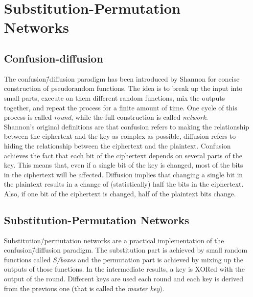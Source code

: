 \section{Substitution-Permutation Networks}
\subsection{Confusion-diffusion}
The confusion\=/diffusion paradigm has been introduced by Shannon for concise construction of pseudorandom functions. The idea is to break up the input into small parts, execute on them different random functions, mix the outputs together, and repeat the process for a finite amount of time. One cycle of this process is called \emph{round}, while the full construction is called \emph{network}.\\
Shannon's original definitions are that confusion refers to making the relationship between the ciphertext and the key as complex as possible, diffusion refers to hiding the relationship between the ciphertext and the plaintext.
Confusion achieves the fact that each bit of the ciphertext depends on several parts of the key. This means that, even if a single bit of the key is changed, most of the bits in the ciphertext will be affected.
Diffusion implies that changing a single bit in the plaintext results in a change of (statistically) half the bits in the ciphertext. Also, if one bit of the ciphertext is changed, half of the plaintext bits change.

\subsection{Substitution-Permutation Networks}
Substitution\=/permutation networks are a practical implementation of the confusion\=/diffusion paradigm. The substitution part is achieved by small random functions called \emph{S\=/boxes} and the permutation part is achieved by mixing up the outputs of those functions. In the intermediate results, a key is XORed with the output of the round. Different keys are used each round and each key is derived from the previous one (that is called the \emph{master key}).

